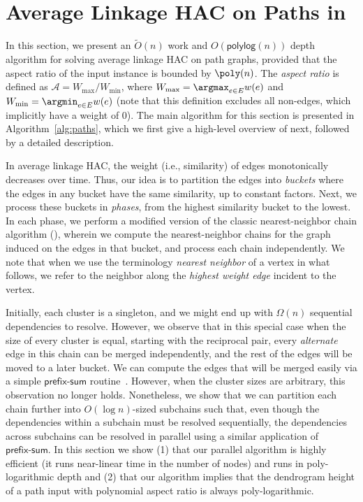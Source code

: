 
\section{Average Linkage HAC on Paths in \NC}\label{sec:pathupperbound}
In this section, we present an $\tilde{O}(n)$ work and $O(\mathsf{polylog}(n))$ depth algorithm for solving average linkage HAC on path graphs, provided that the aspect ratio of the input instance is bounded by $\poly(n)$.
The {\em aspect ratio} is defined as $\mathcal{A} = W_{\max}/W_{\min}$, where $W_{\max} = \argmax_{e \in E} w(e)$ and $W_{\min} = \argmin_{e\in E} w(e)$ (note that this definition excludes all non-edges, which implicitly have a weight of 0).
The main algorithm for this section is presented in Algorithm~\ref{alg:paths}, which we first give a high-level overview of next, followed by a detailed description.



In average linkage HAC, the weight (i.e., similarity) of edges monotonically decreases over time. 
Thus, our idea is to partition the edges into \emph{buckets} where the edges in any bucket have the same similarity, up to constant factors. 
Next, we process these buckets in {\em phases}, from the highest similarity bucket to the lowest. 
In each phase, we perform a modified version of the classic nearest-neighbor chain algorithm (), wherein we compute the nearest-neighbor chains for the graph induced on the edges in that bucket, and process each chain independently. 
We note that when we use the terminology {\em nearest neighbor} of a vertex in what follows, we refer to the neighbor along the {\em highest weight edge} incident to the vertex.

Initially, each cluster is a singleton, and we might end up with $\Omega(n)$ sequential dependencies to resolve. 
However, we observe that in this special case when the size of every cluster is equal, starting with the reciprocal pair, every {\em alternate} edge in this chain can be merged independently, and the rest of the edges will be moved to a later bucket. 
We can compute the edges that will be merged easily via a simple $\mathsf{prefix\text{-}sum}$ routine~\cite{blellochscan}. 
However, when the cluster sizes are arbitrary, this observation no longer holds.
Nonetheless, we show that we can partition each chain further into $O(\log n)$-sized subchains such that, even though the dependencies within a subchain must be resolved sequentially, the dependencies across subchains can be resolved in parallel using a similar application of $\mathsf{prefix\text{-}sum}$. 
In this section we show (1) that our parallel algorithm is highly efficient (it runs near-linear time in the number of nodes) and runs in poly-logarithmic depth and (2) that our algorithm implies that the dendrogram height of a path input with polynomial aspect ratio is always poly-logarithmic.

